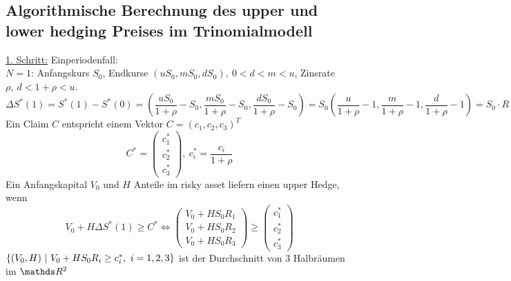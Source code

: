 \subsection{Algorithmische Berechnung des upper und lower hedging Preises im Trinomialmodell}
\label{sub:alg_berechnung}
\uline{1. Schritt:} Einperiodenfall:\\
$N=1$: Anfangskurs $S_0$, Endkurse $(uS_0,mS_0,dS_0),~0<d<m<u$, Zinsrate $\rho,~d<1+\rho<u$.
\[
\Delta S^*(1)=S^*(1)-S^*(0)=(\frac{uS_0}{1+\rho}-S_0,\frac{mS_0}{1+\rho}-S_0,\frac{dS_0}{1+\rho}-S_0)=S_0(\frac{u}{1+\rho}-1,\frac{m}{1+\rho}-1,\frac{d}{1+\rho}-1)=S_0\cdot R
\]
Ein Claim $C$ entspricht einem Vektor $C=(c_1,c_2,c_3)^T$
\[
C^*=\left(\begin{array}{c}c_1^*\\c_2^*\\c_3^* \end{array}\right),~c_i^*=\frac{c_i}{1+\rho}
\]
Ein Anfangskapital $V_0$ und $H$ Anteile im risky asset liefern einen upper Hedge, wenn 
\[
V_0+H\Delta S^*(1)\ge C^*\Leftrightarrow \left(\begin{array}{c}V_0+HS_0R_1\\V_0+HS_0R_2\\V_0+HS_0R_3 \end{array}\right)\ge \left(\begin{array}{c}c_1^*\\c_2^*\\c_3^*     \end{array}\right)
\]
$\left\{(V_0,H)~|~V_0+HS_0R_i\ge c_i^*,~i=1,2,3\right\}$ ist der Durchschnitt von 3 Halbräumen im $\R^2$
